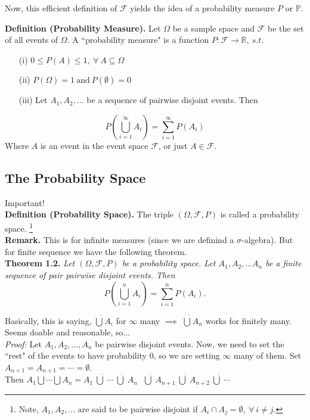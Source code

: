 \documentclass[12pt]{book}
\begin{document}
Now, this efficient definition of $\mathcal{F}$ yields the idea of a probability measure $P$ or $\mathbb{P}$.

\noindent \textbf{Definition (Probability Measure).} Let $\Omega$ be a sample space and $\mathcal{F}$ be the set of all events of $\Omega$. 
A ``probability measure" is a function $P: \mathcal{F} \rightarrow \mathbb{R},~s.t.$
\begin{itemize}
\item[(i)] $0\leq P(A)\leq 1,~\forall~ A\subseteq \Omega$
\item[(ii)] $P(\Omega) =1 ~\text{and}~ P(\emptyset) =0$
\item[\hypertarget{axiom(iii)}{(iii)}] Let $A_1, A_2, ...$ be a sequence of pairwise disjoint events. Then 
\end{itemize}
$$P\left( \bigcup\limits_{i=1}^{\infty} A_i\right) = \sum\limits_{i=1}^{\infty}P(A_i)$$
\noindent Where $A$ is an event in the event space $\mathcal{F}$, or just $A\in\mathcal{F}$.

\subsection{The Probability Space}
Important! \\
\noindent \textbf{Definition (Probability Space).} The triple $(\Omega,\mathcal{F}, P)$ is called a probability space. \footnote{Note, $A_1, A_2, ...$ are said to be pairwise disjoint if $A_i \cap A_j = \emptyset,~\forall~ i\neq j$.}\\

\noindent\textbf{Remark.} This is for infinite measures (since we are definind a $\sigma$-algebra). But for finite sequence we have the following theorem.\\

\noindent \textbf{Theorem 1.2.} \textit{Let $(\Omega, \mathcal{F}, P)$ be a probability space. Let $A_1, A_2, ...A_n$ be a finite sequence of pair pairwise disjoint events. Then 
$$P\left( \bigcup\limits_{i=1}^{n} A_i\right) = \sum\limits_{i=1}^{n}P(A_i).$$}

Basically, this is saying, $\dot{\bigcup}A_i$ for $\infty$ many $\implies{}$ $\dot{\bigcup}A_n$ works for finitely many. Seems doable and reasonable, so...\\

\noindent\textit{Proof:} Let $A_1, A_2,...,A_n$ be pairwise disjoint events. 
Now, we need to set the ``rest" of the events to have probability 0, so we are setting $\infty$ many of them.
Set $A_{n+1} = A_{n+1} =\cdots = \emptyset$. \\
Then $A_1 \bigcup \cdots \bigcup A_n=A_1 ~\dot{\bigcup}~ \cdots ~\dot{\bigcup}~A_n ~~~\dot{\bigcup}~ A_{n+1} ~\dot{\bigcup}~ A_{n+2} ~\dot{\bigcup}~ \cdots$\\
\end{document}
